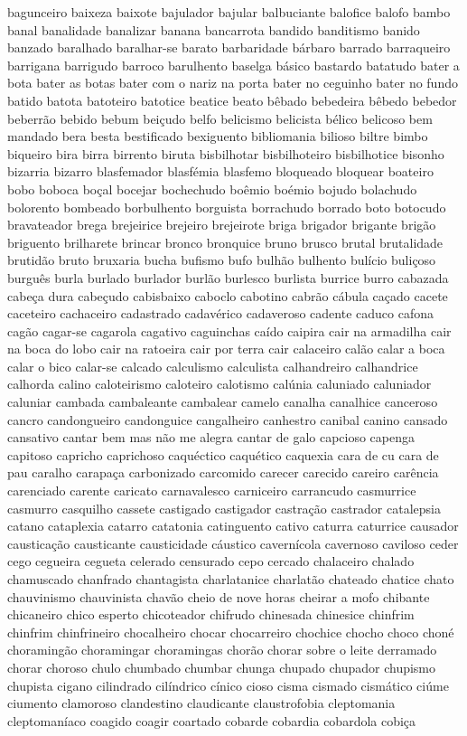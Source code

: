 \begin{appendices}
bagunceiro baixeza baixote bajulador bajular balbuciante balofice balofo bambo banal banalidade banalizar banana bancarrota bandido banditismo banido banzado baralhado baralhar-se barato barbaridade b\'{a}rbaro barrado barraqueiro barrigana barrigudo barroco barulhento baselga b\'{a}sico bastardo batatudo bater a bota bater as botas bater com o nariz na porta bater no ceguinho bater no fundo batido batota batoteiro batotice beatice beato b\^{e}bado bebedeira b\^{e}bedo bebedor beberr\~ao bebido bebum bei\c{c}udo belfo belicismo belicista b\'{e}lico belicoso bem mandado bera besta bestificado bexiguento bibliomania bilioso biltre bimbo biqueiro bira birra birrento biruta bisbilhotar bisbilhoteiro bisbilhotice bisonho bizarria bizarro blasfemador blasf\'{e}mia blasfemo bloqueado bloquear boateiro bobo boboca bo\c{c}al bocejar bochechudo bo\^{e}mio bo\'{e}mio bojudo bolachudo bolorento bombeado borbulhento borguista borrachudo borrado boto botocudo bravateador brega brejeirice brejeiro brejeirote briga brigador brigante brig\~ao briguento brilharete brincar bronco bronquice bruno brusco brutal brutalidade brutid\~ao bruto bruxaria bucha bufismo bufo bulh\~ao bulhento bul\'{i}cio buli\c{c}oso burgu\^{e}s burla burlado burlador burl\~ao burlesco burlista burrice burro cabazada cabe\c{c}a dura cabe\c{c}udo cabisbaixo caboclo cabotino cabr\~ao c\'{a}bula ca\c{c}ado cacete caceteiro cachaceiro cadastrado cadav\'{e}rico cadaveroso cadente caduco cafona cag\~ao cagar-se cagarola cagativo caguinchas ca\'{i}do caipira cair na armadilha cair na boca do lobo cair na ratoeira cair por terra cair calaceiro cal\~ao calar a boca calar o bico calar-se calcado calculismo calculista calhandreiro calhandrice calhorda calino caloteirismo caloteiro calotismo cal\'{u}nia caluniado caluniador caluniar cambada cambaleante cambalear camelo canalha canalhice canceroso cancro candongueiro candonguice cangalheiro canhestro canibal canino cansado cansativo cantar bem mas n\~ao me alegra cantar de galo capcioso capenga capitoso capricho caprichoso caqu\'{e}ctico caqu\'{e}tico caquexia cara de cu cara de pau caralho carapa\c{c}a carbonizado carcomido carecer carecido careiro car\^{e}ncia carenciado carente caricato carnavalesco carniceiro carrancudo casmurrice casmurro casquilho cassete castigado castigador castra\c{c}\~ao castrador catalepsia catano cataplexia catarro catatonia catinguento cativo caturra caturrice causador caustica\c{c}\~ao causticante causticidade c\'{a}ustico cavern\'{i}cola cavernoso caviloso ceder cego cegueira cegueta celerado censurado cepo cercado chalaceiro chalado chamuscado chanfrado chantagista charlatanice charlat\~ao chateado chatice chato chauvinismo chauvinista chav\~ao cheio de nove horas cheirar a mofo chibante chicaneiro chico esperto chicoteador chifrudo chinesada chinesice chinfrim chinfrim chinfrineiro chocalheiro chocar chocarreiro chochice chocho choco chon\'{e} choraming\~ao choramingar choramingas chor\~ao chorar sobre o leite derramado chorar choroso chulo chumbado chumbar chunga chupado chupador chupismo chupista cigano cilindrado cil\'{i}ndrico c\'{i}nico cioso cisma cismado cism\'{a}tico ci\'{u}me ciumento clamoroso clandestino claudicante claustrofobia cleptomania cleptoman\'{i}aco coagido coagir coartado cobarde cobardia cobardola cobi\c{c}a 
\end{appendices}
